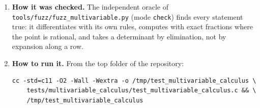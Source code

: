\documentclass[11pt,a4paper]{article}
\begin{document}
\begin{enumerate}
\item \textbf{How it was checked.} The independent oracle of \texttt{tools/fuzz/fuzz\_multivariable.py} (mode \texttt{check}) finds every statement true: it differentiates with its own rules, computes with exact fractions where the point is rational, and takes a determinant by elimination, not by expansion along a row.

\item \textbf{How to run it.} From the top folder of the repository:
\begin{verbatim}
cc -std=c11 -O2 -Wall -Wextra -o /tmp/test_multivariable_calculus \
    tests/multivariable_calculus/test_multivariable_calculus.c && \
    /tmp/test_multivariable_calculus
\end{verbatim}
\end{enumerate}
\end{document}
